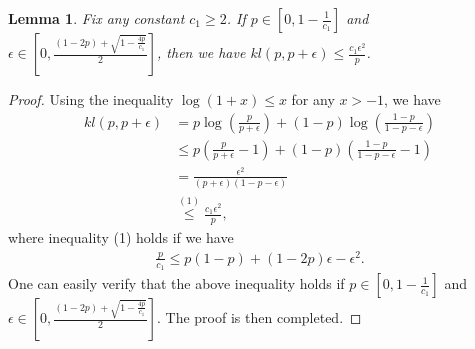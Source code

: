\documentclass[11pt]{article}
\newtheorem{lemma}{Lemma}
\newcommand{\1}{\mathbbm{1}}
\begin{document}
\begin{lemma}\label{L16}
Fix any constant $c_1\geq 2$. If $p\in [0,1-\frac{1}{c_1}]$ and $\epsilon\in \left [0,\frac{(1-2p)+\sqrt{1-\frac{4p}{c_1}}}{2}\right ]$, then we have %
$kl(p,p+\epsilon)\leq \frac{c_1 \epsilon^2}{p}$. %
\end{lemma}
\begin{proof}
Using the inequality $\log(1+x)\leq x$ for any $x>-1$, we have
\begin{align*}
kl(p,p+\epsilon)&=p\log\left (\frac{p}{p+\epsilon}\right )+(1-p)\log\left (\frac{1-p}{1-p-\epsilon}\right )\\
&\leq p\left (\frac{p}{p+\epsilon}-1 \right )+(1-p)\left (\frac{1-p}{1-p-\epsilon}-1 \right )\\
&=\frac{\epsilon^2}{(p+\epsilon)(1-p-\epsilon)}\\
&\overset{(1)}{\leq} \frac{c_1\epsilon^2}{p},
\end{align*}
where inequality (1) holds if we have
\begin{align*}
\frac{p}{c_1}\leq p(1-p)+(1-2p)\epsilon-\epsilon^2.
\end{align*}
One can easily verify that the above inequality holds if $p\in [0,1-\frac{1}{c_1}]$ and $\epsilon\in \left [0,\frac{(1-2p)+\sqrt{1-\frac{4p}{c_1}}}{2}\right ]$. The proof is then completed. 
\end{proof}
\end{document}
